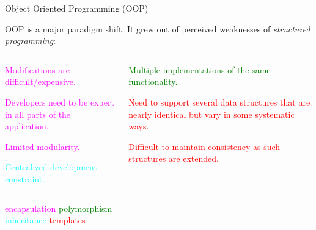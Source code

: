 \documentclass[11pt]{beamer}
\newcommand{\bi}{\begin{itemize}}
\newcommand{\ei}{\end{itemize}}
\begin{document}

\begin{frame}{Object Oriented Programming (OOP)}

OOP is a major paradigm shift. It grew out of perceived weaknesses of \emph{structured programming}:
\begin{columns}[onlytextwidth,t]
  \begin{column}{0.48\textwidth}
  \bi
  \item \textcolor{magenta}{Modifications are difficult/expensive.
  \item Developers need to be expert in all parts of the application.
  \item Limited modularity.}
  \item \textcolor{cyan}{Centralized development constraint.}

  \ei
  \end{column}
  \begin{column}{0.48\textwidth}
  \bi
  \item \textcolor{green}{Multiple implementations of the same functionality.}

  \item \textcolor{red}{Need to support several data structures that are nearly identical but vary in some systematic ways.
\item Difficult to maintain consistency as such structures are extended.}

  \ei

  \end{column}
\end{columns}

  \vfill
  \scriptsize{
\quad \quad \quad \textcolor{magenta}{encapsulation}
\quad \quad \quad \quad \quad \quad 
\quad \quad \quad \quad \quad \quad \quad \textcolor{green}{polymorphism}\\
\quad \quad \quad \textcolor{cyan}{inheritance}
\quad \quad \quad \quad \quad \quad 
\quad \quad \quad \quad \quad \quad \quad \quad \textcolor{red}{templates}
}

\end{frame}
\end{document}
